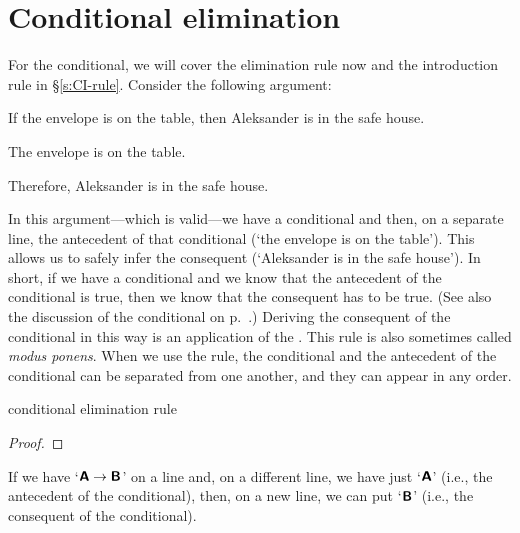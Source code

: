 

\section{Conditional elimination}

For the conditional, we will cover the elimination rule now and the introduction rule in \S \ref{s:CI-rule}. Consider the following argument:
	\begin{earg}
	\item	If the envelope is on the table, then Aleksander is in the safe house.
	\item The envelope is on the table.
	\item Therefore, Aleksander is in the safe house.
	\end{earg}
In this argument---which is valid---we have a conditional and then, on a separate line, the antecedent of that conditional (`the envelope is on the table'). This allows us to safely infer the consequent (`Aleksander is in the safe house'). In short, if we have a conditional and we know that the antecedent of the conditional is true, then we know that the consequent has to be true. (See also the discussion of the conditional on p.~\pageref{characteristic-tt-conditional}.) Deriving the consequent of the conditional in this way is an application of the .
This rule is also sometimes called \emph{modus ponens}. When we use the rule, the conditional and the antecedent of the conditional can be separated from one another, and they can appear in any order.

\medskip


\begin{factboxy}{conditional elimination rule}\label{ce-rule}
\begin{proof}
	 
\end{proof}

\small{If we have `$\bm{\mathsf{A}}\rightarrow\bm{\mathsf{B}}$' on a line and, on a different line, we have just `$\bm{\mathsf{A}}$' (i.e., the antecedent of the conditional), then, on a new line, we can put `$\bm{\mathsf{B}}$' (i.e., the consequent of the conditional).} 

\end{factboxy}


